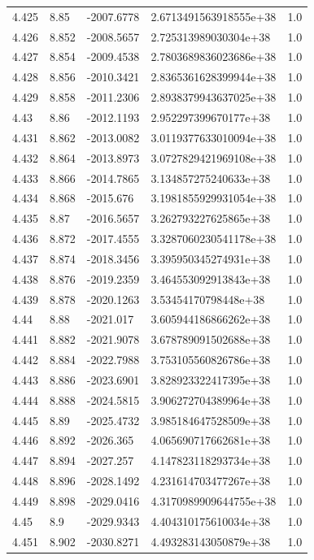 \begin{tabular}{lllll}
4.425 & 8.85 & -2007.6778 & 2.6713491563918555e+38 & 1.0 \\
4.426 & 8.852 & -2008.5657 & 2.725313989030304e+38 & 1.0 \\
4.427 & 8.854 & -2009.4538 & 2.7803689836023686e+38 & 1.0 \\
4.428 & 8.856 & -2010.3421 & 2.8365361628399944e+38 & 1.0 \\
4.429 & 8.858 & -2011.2306 & 2.8938379943637025e+38 & 1.0 \\
4.43 & 8.86 & -2012.1193 & 2.952297399670177e+38 & 1.0 \\
4.431 & 8.862 & -2013.0082 & 3.0119377633010094e+38 & 1.0 \\
4.432 & 8.864 & -2013.8973 & 3.0727829421969108e+38 & 1.0 \\
4.433 & 8.866 & -2014.7865 & 3.134857275240633e+38 & 1.0 \\
4.434 & 8.868 & -2015.676 & 3.1981855929931054e+38 & 1.0 \\
4.435 & 8.87 & -2016.5657 & 3.262793227625865e+38 & 1.0 \\
4.436 & 8.872 & -2017.4555 & 3.3287060230541178e+38 & 1.0 \\
4.437 & 8.874 & -2018.3456 & 3.395950345274931e+38 & 1.0 \\
4.438 & 8.876 & -2019.2359 & 3.464553092913843e+38 & 1.0 \\
4.439 & 8.878 & -2020.1263 & 3.53454170798448e+38 & 1.0 \\
4.44 & 8.88 & -2021.017 & 3.605944186866262e+38 & 1.0 \\
4.441 & 8.882 & -2021.9078 & 3.678789091502688e+38 & 1.0 \\
4.442 & 8.884 & -2022.7988 & 3.753105560826786e+38 & 1.0 \\
4.443 & 8.886 & -2023.6901 & 3.828923322417395e+38 & 1.0 \\
4.444 & 8.888 & -2024.5815 & 3.906272704389964e+38 & 1.0 \\
4.445 & 8.89 & -2025.4732 & 3.985184647528509e+38 & 1.0 \\
4.446 & 8.892 & -2026.365 & 4.065690717662681e+38 & 1.0 \\
4.447 & 8.894 & -2027.257 & 4.147823118293734e+38 & 1.0 \\
4.448 & 8.896 & -2028.1492 & 4.231614703477267e+38 & 1.0 \\
4.449 & 8.898 & -2029.0416 & 4.3170989909644755e+38 & 1.0 \\
4.45 & 8.9 & -2029.9343 & 4.404310175610034e+38 & 1.0 \\
4.451 & 8.902 & -2030.8271 & 4.493283143050879e+38 & 1.0 \\

\end{tabular}

